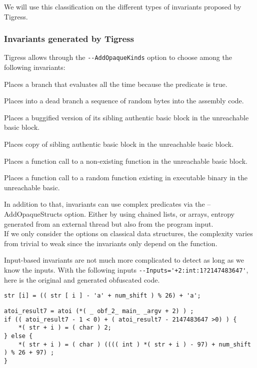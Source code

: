 \documentclass{projectreport}
\begin{document}
We will use this classification on the different types of invariants proposed by Tigress.

\subsubsection{Invariants generated by Tigress}

Tigress allows through the \verb|--AddOpaqueKinds| option to choose among the following invariants: 

\begin{description}[font=\sffamily\bfseries, leftmargin=1cm, style=nextline]
  \item[True]
    Places a branch that evaluates all the time because the predicate is true.
  \item[Junk]
    Places into a dead branch a sequence of random bytes into the assembly code.
  \item[Bug]
    Places a buggified version of its sibling authentic basic block in the unreachable basic block.
  \item[Question]
  Places copy of sibling authentic basic block in the unreachable basic block. 
  \item[Fake]
  Places a function call to a non-existing function in the unreachable basic block.
  \item[Call]
  Places a function call to a random function existing in executable binary in the unreachable basic.
\end{description}

In addition to that, invariants can use complex predicates via the --AddOpaqueStructs option. Either by using chained lists, or arrays, entropy generated from an external thread but also from the program input. \\

If we only consider the options on classical data structures, the complexity varies from trivial to weak since the invariants only depend on the function.
\begin{example}
Input-based invariants are not much more complicated to detect as long as we know the inputs.
With the following inputs \verb|--Inputs='+2:int:1?2147483647'|, here is the original and generated obfuscated code.
\begin{verbatim}
str [i] = (( str [ i ] - 'a' + num_shift ) % 26) + 'a';
\end{verbatim}
\begin{verbatim}
atoi_result7 = atoi (*( _ obf_2_ main_ _argv + 2) ) ;
if (( atoi_result7 - 1 < 0) + ( atoi_result7 - 2147483647 >0) ) {
    *( str + i ) = ( char ) 2;
} else {
    *( str + i ) = ( char ) (((( int ) *( str + i ) - 97) + num_shift ) % 26 + 97) ;
}
\end{verbatim}
\end{example}
\end{document}
